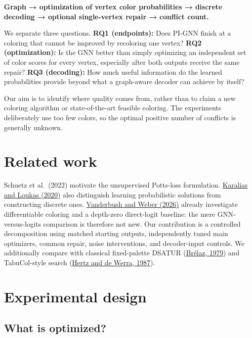\documentclass[11pt,letterpaper,twocolumn]{article}
\begin{document}
\textbf{Graph → optimization of vertex color probabilities → discrete decoding → optional single-vertex repair → conflict count.}

We separate three questions. \textbf{RQ1 (endpoints):} Does PI-GNN finish at a coloring that cannot be improved by recoloring one vertex? \textbf{RQ2 (optimization):} Is the GNN better than simply optimizing an independent set of color scores for every vertex, especially after both outputs receive the same repair? \textbf{RQ3 (decoding):} How much useful information do the learned probabilities provide beyond what a graph-aware decoder can achieve by itself?

Our aim is to identify where quality comes from, rather than to claim a new coloring algorithm or state-of-the-art feasible coloring. The experiments deliberately use too few colors, so the optimal positive number of conflicts is generally unknown.

\section{Related work}\label{related-work}

Schuetz et al.~(2022) motivate the unsupervised Potts-loss formulation. \href{https://proceedings.neurips.cc/paper/2020/hash/49f85a9ed090b20c8bed85a5923c669f-Abstract.html}{Karalias and Loukas (2020)} also distinguish learning probabilistic solutions from constructing discrete ones. \href{https://arxiv.org/html/2601.05137v1}{Vanderbush and Weber (2026)} already investigate differentiable coloring and a depth-zero direct-logit baseline: the mere GNN-versus-logits comparison is therefore not new. Our contribution is a controlled decomposition using matched starting outputs, independently tuned main optimizers, common repair, noise interventions, and decoder-input controls. We additionally compare with classical fixed-palette DSATUR (\href{https://doi.org/10.1145/359094.359101}{Brélaz, 1979}) and TabuCol-style search (\href{https://doi.org/10.1007/BF02239976}{Hertz and de Werra, 1987}).

\section{Experimental design}\label{experimental-design}

\subsection{What is optimized?}\label{what-is-optimized}
\end{document}
